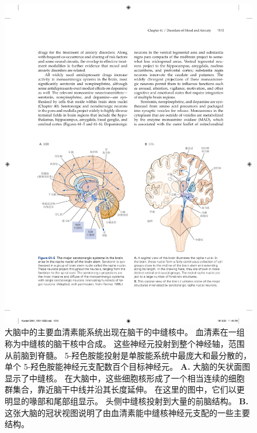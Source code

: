 \begin{figure}[htbp]
	\centering
	\includegraphics[width=1.0\linewidth]{chap61/fig_61_5}
	\caption{大脑中的主要血清素能系统出现在脑干的中缝核中。
		血清素在一组称为中缝核的脑干核中合成。
		这些神经元投射到整个神经轴，范围从前脑到脊髓。
		5-羟色胺能投射是单胺能系统中最庞大和最分散的，单个 5-羟色胺能神经元支配数百个目标神经元\cite{heimer2012human}。
		\textbf{A.} 大脑的矢状面图显示了中缝核。
		在大脑中，这些细胞核形成了一个相当连续的细胞群集合，靠近脑干中线并沿其长度延伸。
		在这里的图中，它们以更明显的喙部和尾部组显示。
		头侧中缝核投射到大量的前脑结构。
		\textbf{B.} 这张大脑的冠状视图说明了由血清素能中缝核神经元支配的一些主要结构。}
	\label{fig:61_5}
\end{figure}


